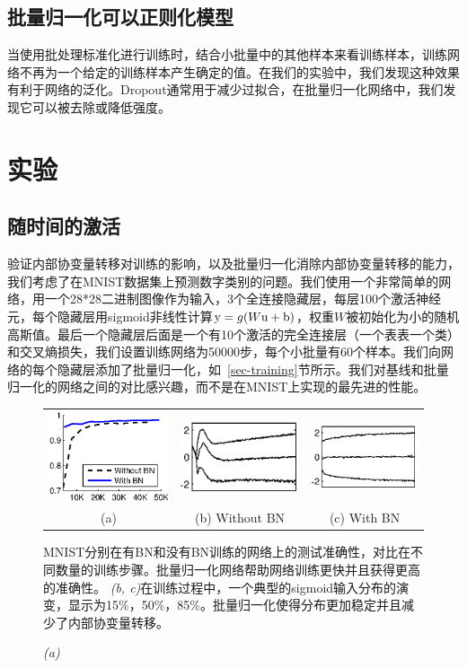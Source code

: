 \documentclass[twocolumn]{article}
\begin{document}
\subsection{批量归一化可以正则化模型} 
\label{sec-regularizer}
当使用批处理标准化进行训练时，结合小批量中的其他样本来看训练样本，训练网络不再为一个给定的训练样本产生确定的值。在我们的实验中，我们发现这种效果有利于网络的泛化。Dropout通常用于减少过拟合，在批量归一化网络中，我们发现它可以被去除或降低强度。

\section{实验}



\subsection{随时间的激活}

验证内部协变量转移对训练的影响，以及批量归一化消除内部协变量转移的能力，我们考虑了在MNIST数据集\cite{mnist}上预测数字类别的问题。我们使用一个非常简单的网络，用一个28*28二进制图像作为输入，3个全连接隐藏层，每层100个激活神经元，每个隐藏层用sigmoid非线性计算$\mathrm{y} = g(W\mathrm{u}+\mathrm{b})$，权重$W$被初始化为小的随机高斯值。最后一个隐藏层后面是一个有10个激活的完全连接层（一个表表一个类）和交叉熵损失，我们设置训练网络为50000步，每个小批量有60个样本。我们向网络的每个隐藏层添加了批量归一化，如~\ref{sec-training}节所示。我们对基线和批量归一化的网络之间的对比感兴趣，而不是在MNIST上实现的最先进的性能。

\begin{figure}
\centering
\begin{tabular}{@{}c@{\,}c@{}c@{}}
\includegraphics[width=0.28\columnwidth]{mnist.eps}
&
\includegraphics[width=0.35\columnwidth]{evo.eps}&
\includegraphics[width=0.35\columnwidth]{evo-bn.eps}\\
(a)&(b) Without BN&(c) With BN
\end{tabular} 
\caption{\em(a)} 
MNIST分别在有BN和没有BN训练的网络上的测试准确性，对比在不同数量的训练步骤。批量归一化网络帮助网络训练更快并且获得更高的准确性。
{\em(b, c)}在训练过程中，一个典型的sigmoid输入分布的演变，显示为{15\%，50\%，85\%}。批量归一化使得分布更加稳定并且减少了内部协变量转移。
\label{fig-mnist}
\end{figure}
\end{document}
